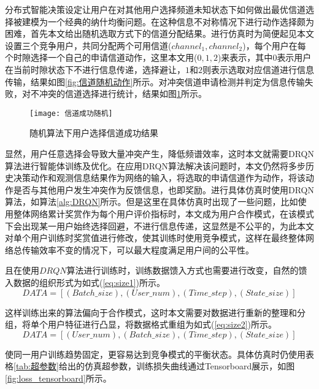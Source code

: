 分布式智能决策设定让用户在对其他用户选择频道未知状态下如何做出最优信道选择被建模为一个经典的纳什均衡问题。在这种信息不对称情况下进行动作选择颇为困难，首先本文给出随机选取方式下的信道分配结果。进行仿真时为简便起见本文设置三个竞争用户，共同分配两个可用信道($channel_{1},channel_{2}$)，每个用户在每个时隙选择一个自己的申请信道动作，这里本文用($0,1,2$)来表示，其中$0$表示用户在当前时隙状态下不进行信息传递，选择避让，$1$和$2$则表示选取对应信道进行信息传输，结果如图\ref{fig:信道随机动作}所示。对冲突信道申请检测并判定为信息传输失败，对不冲突的信道选择进行统计，结果如图\ref{fig:信道成功随机}所示。
\begin{figure}[htbp]
	\centering
	\texttt{[image: 信道成功随机]}
	\caption{随机算法下用户选择信道成功结果}
	\label{fig:信道成功随机}
\end{figure}

显然，用户任意选择会导致大量冲突产生，降低频谱效率，这时本文就需要DRQN算法进行智能体训练及优化。在应用DRQN算法解决该问题时，本文仍然将多步历史决策动作和观测信息结果作为网络的输入，将选取的申请信道作为动作，将该动作是否与其他用户发生冲突作为反馈信息，也即奖励。进行具体仿真时使用DRQN算法，如算法\ref{alg:DRQN}所示。但是这里在具体仿真时出现了一些问题，比如使用整体网络累计奖赏作为每个用户评价指标时，本文成为用户合作模式，在该模式下会出现某一用户始终选择回避，不进行信息传递，这显然是不公平的，为此本文对单个用户训练时奖赏值进行修改，使其训练时使用竞争模式，这样在最终整体网络总传输效率不变的情况下，可以最大程度满足用户间的公平性。

且在使用$DRQN$算法进行训练时，训练数据馈入方式也需要进行改变，自然的馈入数据的组织形式为如式(\ref{eq:size1})所示。
\begin{equation}\label{eq:size1}
DATA=\left[\left(Batch\_size \right),\left(User\_num \right),\left(Time\_step \right),\left(State\_size \right)\right]
\end{equation}

这样训练出来的算法偏向于合作模式，这时本文需要对数据进行重新的整理和分组，将单个用户特征进行凸显，将数据格式重组为如式(\ref{eq:size2})所示。
\begin{equation}\label{eq:size2}
DATA=\left[\left(User\_num \right),\left(Batch\_size \right),\left(Time\_step \right),\left(State\_size \right)\right]
\end{equation} 

使同一用户训练趋势固定，更容易达到竞争模式的平衡状态。具体仿真时仍使用表格\ref{tab:超参数}给出的仿真超参数，训练损失曲线通过Tensorboard展示，如图\ref{fig:loss_tensorboard}所示。

